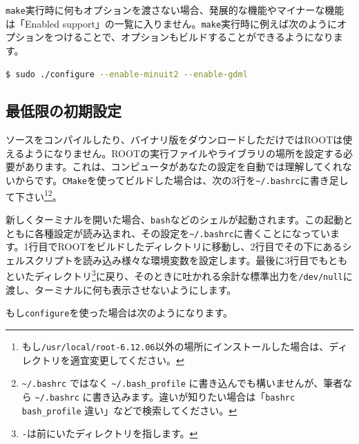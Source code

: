 \texttt{make}実行時に何もオプションを渡さない場合、発展的な機能やマイナーな機能は「Enabled support」の一覧に入りません。\texttt{make}実行時に例えば次のようにオプションをつけることで、オプションもビルドすることができるようになります。

\begin{lstlisting}[language=bash]
$ sudo ./configure --enable-minuit2 --enable-gdml
\end{lstlisting}

\subsection{最低限の初期設定}
\label{subsec:settings}
ソースをコンパイルしたり、バイナリ版をダウンロードしただけではROOTは使えるようになりません。ROOTの実行ファイルやライブラリの場所を設定する必要があります。これは、コンピュータがあなたの設定を自動では理解してくれないからです。\texttt{CMake}を使ってビルドした場合は、次の3行を\texttt{\~{}/.bashrc}に書き足して下さい\footnote{もし\texttt{/usr/local/root-6.12.06}以外の場所にインストールした場合は、ディレクトリを適宜変更してください。}\footnote{\texttt{\~{}/.bashrc} ではなく \texttt{\~{}/.bash\_profile} に書き込んでも構いませんが、筆者なら \texttt{\~{}/.bashrc} に書き込みます。違いが知りたい場合は「\texttt{bashrc} \texttt{bash\_profile} 違い」などで検索してください。}。
\begin{NoFloat}

\end{NoFloat}

新しくターミナルを開いた場合、\texttt{bash}などのシェルが起動されます。この起動とともに各種設定が読み込まれ、その設定を\texttt{\~{}/.bashrc}に書くことになっています。1行目でROOTをビルドしたディレクトリに移動し、2行目でその下にあるシェルスクリプトを読み込み様々な環境変数を設定します。最後に3行目でもともといたディレクトリ\footnote{\texttt{-}は前にいたディレクトリを指します。}に戻り、そのときに吐かれる余計な標準出力を\texttt{/dev/null}に渡し、ターミナルに何も表示させないようにします。

もし\texttt{configure}を使った場合は次のようになります。
\begin{NoFloat}

\end{NoFloat}

